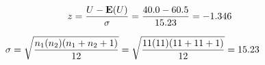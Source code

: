 \documentclass[12pt]{article}
\begin{document}
\pagestyle{empty}
\Large
{}
\pagecolor{ehandbook}

\boldmath

\begin{eqnarray*}
z = \frac{U - \mbox{\bf E}(U)}{\sigma} = \frac{40.0 - 60.5}{15.23} = -1.346
\end{eqnarray*}

\vspace*{.25in}

\begin{eqnarray*}
\hspace*{-.5in}
\sigma = \sqrt{\frac{n_1(n_2)(n_1+n_2+1)}{12}} = \sqrt{\frac{11(11)(11+11+1)}{12}} = 15.23
\end{eqnarray*}
\end{document}
